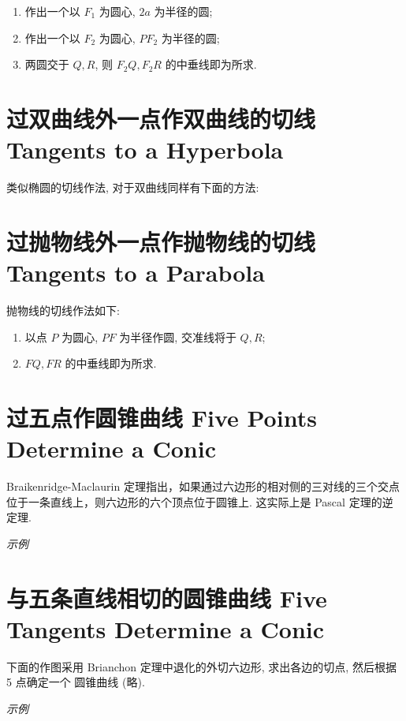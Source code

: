 \begin{enumerate}
  \item 作出一个以 $F_1$ 为圆心, $2a$ 为半径的圆;
  \item 作出一个以 $F_2$ 为圆心, $PF_2$ 为半径的圆;
  \item 两圆交于 $Q,R$, 则 $F_2Q,F_2R$ 的中垂线即为所求.
\end{enumerate}


\section{过双曲线外一点作双曲线的切线 Tangents to a Hyperbola}

类似椭圆的切线作法, 对于双曲线同样有下面的方法:



\section{过抛物线外一点作抛物线的切线 Tangents to a Parabola}

抛物线的切线作法如下:

\begin{enumerate}
  \item 以点 $P$ 为圆心, $PF$ 为半径作圆, 交准线将于 $Q,R$;
  \item $FQ,FR$ 的中垂线即为所求.
\end{enumerate}

\section{过五点作圆锥曲线 Five Points Determine a Conic}

Braikenridge-Maclaurin 定理指出，如果通过六边形的相对侧的三对线的三个交点位于一条直线上，则六边形的六个顶点位于圆锥上. 这实际上是 Pascal 定理的逆定理.

\emph{示例}


\section{与五条直线相切的圆锥曲线 Five Tangents Determine a Conic}

下面的作图采用 Brianchon 定理中退化的外切六边形, 求出各边的切点, 然后根据 5 点确定一个
圆锥曲线 (略).

\emph{示例}



